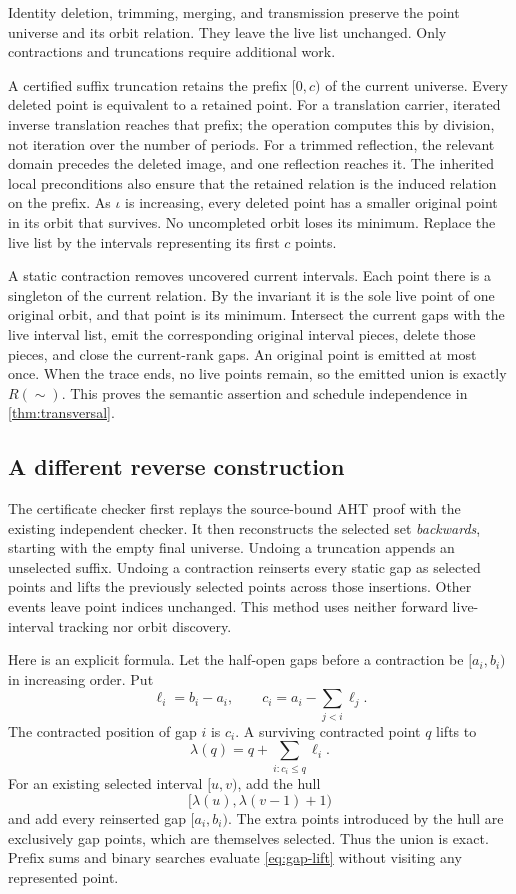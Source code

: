 Identity deletion, trimming, merging, and transmission preserve the point
universe and its orbit relation. They leave the live list unchanged.
Only contractions and truncations require additional work.

A certified suffix truncation retains the prefix $[0,c)$ of the current
universe. Every deleted point is equivalent to a retained point. For a
translation carrier, iterated inverse translation reaches that prefix; the
operation computes this by division, not iteration over the number of
periods. For a trimmed reflection, the relevant domain precedes the deleted
image, and one reflection reaches it. The inherited local preconditions
also ensure that the retained relation is the induced relation on the
prefix. As $\iota$ is increasing, every deleted point has a smaller original
point in its orbit that survives. No uncompleted orbit loses its minimum.
Replace the live list by the intervals representing its first $c$ points.

A static contraction removes uncovered current intervals. Each point there
is a singleton of the current relation. By the invariant it is the sole live
point of one original orbit, and that point is its minimum. Intersect the
current gaps with the live interval list, emit the corresponding original
interval pieces, delete those pieces, and close the current-rank gaps.
An original point is emitted at most once. When the trace ends, no live
points remain, so the emitted union is exactly $R(\sim)$. This proves the
semantic assertion and schedule independence in \cref{thm:transversal}.

\subsection{A different reverse construction}

The certificate checker first replays the source-bound AHT proof with the
existing independent checker. It then reconstructs the selected set
\emph{backwards}, starting with the empty final universe. Undoing a
truncation appends an unselected suffix. Undoing a contraction reinserts
every static gap as selected points and lifts the previously selected
points across those insertions. Other events leave point indices unchanged.
This method uses neither forward live-interval tracking nor orbit discovery.

Here is an explicit formula. Let the half-open gaps before a contraction be
$[a_i,b_i)$ in increasing order. Put
\[
 \ell_i=b_i-a_i,\qquad
 c_i=a_i-\sum_{j<i}\ell_j.
\]
The contracted position of gap $i$ is $c_i$. A surviving contracted point
$q$ lifts to
\begin{equation}
 \lambda(q)=q+\sum_{i:c_i\le q}\ell_i.
 \label{eq:gap-lift}
\end{equation}
For an existing selected interval $[u,v)$, add the hull
\[
 [\lambda(u),\lambda(v-1)+1)
\]
and add every reinserted gap $[a_i,b_i)$. The extra points introduced by the
hull are exclusively gap points, which are themselves selected. Thus the
union is exact. Prefix sums and binary searches evaluate \eqref{eq:gap-lift}
without visiting any represented point.

